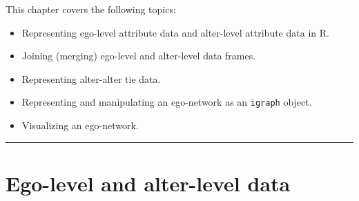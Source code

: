 \documentclass[
]{book}
\providecommand{\tightlist}{%
  \setlength{\itemsep}{0pt}\setlength{\parskip}{0pt}}
\begin{document}
This chapter covers the following topics:

\begin{itemize}
\tightlist
\item
  Representing ego-level attribute data and alter-level attribute data in R.
\item
  Joining (merging) ego-level and alter-level data frames.
\item
  Representing alter-alter tie data.
\item
  Representing and manipulating an ego-network as an \texttt{igraph} object.
\item
  Visualizing an ego-network.
\end{itemize}

\begin{center}\rule{0.5\linewidth}{0.5pt}\end{center}

\hypertarget{egocentric-data}{%
\section{Ego-level and alter-level data}\label{egocentric-data}}
\end{document}
